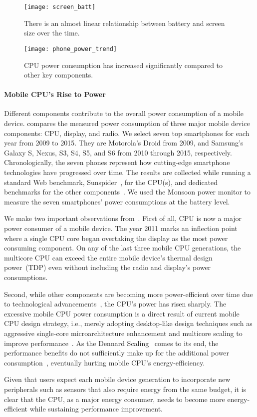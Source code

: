 \begin{figure}[t]
  \centering
  \texttt{[image: screen\_batt]}
  \caption{\small{There is an almost linear relationship between battery and screen size over the time.}}
  \label{fig:screen_batt}
\end{figure}

\begin{figure}[t]
  \centering
  \texttt{[image: phone\_power\_trend]}
  \caption{\small{CPU power consumption has increased significantly compared to other key components.}}
  \label{fig:phone_power_trend}
\end{figure}

\paragraph{Mobile CPU's Rise to Power} Different components contribute to the overall power consumption of a mobile device.  compares the measured power consumption of three major mobile device components: CPU, display, and radio. We select seven top smartphones for each year from 2009 to 2015. They are Motorola's Droid from 2009, and Samsung's Galaxy S, Nexus, S3, S4, S5, and S6 from 2010 through 2015, respectively. Chronologically, the seven phones represent how cutting-edge smartphone technologies have progressed over time. The results are collected while running a standard Web benchmark, Sunspider~\cite{sunspider}, for the CPU(s), and dedicated benchmarks for the other components~\cite{carroll2010analysis, ookla}. We used the Monsoon power monitor to measure the seven smartphones' power consumptions at the battery level.

We make two important observations from~. First of all, CPU is now a major power consumer of a mobile device. The year 2011 marks an inflection point where a single CPU core began overtaking the display as the most power consuming component. On any of the last three mobile CPU generations, the multicore CPU can exceed the entire mobile device's thermal design power~(TDP) even without including the radio and display's power consumptions.

Second, while other components are becoming more power-efficient over time due to technological advancements~\cite{chen2013energy}, the CPU's power has risen sharply. The excessive mobile CPU power consumption is a direct result of current mobile CPU design strategy, i.e., merely adopting desktop-like design techniques such as aggressive single-core microarchitecture enhancement and multicore scaling to improve performance~\cite{mobilecpu}. As the Dennard Scaling~\cite{dennard} comes to its end, the performance benefits do not sufficiently make up for the additional power consumption~\cite{mobilecpu}, eventually hurting mobile CPU's energy-efficiency.

Given that users expect each mobile device generation to incorporate new peripherals such as sensors that also require energy from the same budget, it is clear that the CPU, as a major energy consumer, needs to become more energy-efficient while sustaining performance improvement.

